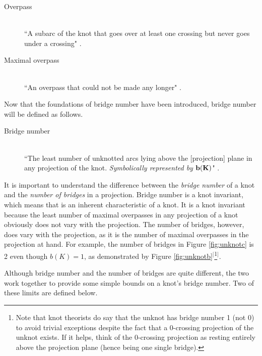 \documentclass[titlepage]{article}
\newcommand{\dq}[4][]{``#2"#1 \cite[#4]{#3}.}
\begin{document}
\begin{defi}
    \begin{description}
        \item[Overpass] \hfill \\ \dq{A subarc of the knot that goes over at least one crossing but never goes under a crossing}{bib:knotbook}{64}
        \item[Maximal overpass] \hfill \\ \dq{An overpass that could not be made any longer}{bib:knotbook}{65}
    \end{description}
\end{defi}

Now that the foundations of bridge number have been introduced, bridge number will be defined as follows.

\begin{defi}
    \begin{description}
        \item[Bridge number] \hfill \\ \dq{The least number of unknotted arcs lying above the [projection] plane in any projection of the knot. \emph{Symbolically represented by} $\bf{b(K)}$}{bib:knotnotes}{24}
    \end{description}
\end{defi}

It is important to understand the difference between the \emph{bridge number} of a knot and the \emph{number of bridges} in a projection. Bridge number is a knot invariant, which means that is an inherent characteristic of a knot. It is a knot invariant because the least number of maximal overpasses in any projection of a knot obviously does not vary with the projection. The number of bridges, however, does vary with the projection, as it is the number of maximal overpasses in the projection at hand. For example, the number of bridges in Figure \ref{fig:unknotc} is 2 even though $b(K)=1$, as demonstrated by Figure \ref{fig:unknotb}$^[$\footnote{Note that knot theorists do say that the unknot has bridge number 1 (not 0) to avoid trivial exceptions despite the fact that a 0-crossing projection of the unknot exists. If it helps, think of the 0-crossing projection as resting entirely above the projection plane (hence being one single bridge).}$^]$.\par
Although bridge number and the number of bridges are quite different, the two work together to provide some simple bounds on a knot's bridge number. Two of these limits are defined below.
\end{document}
